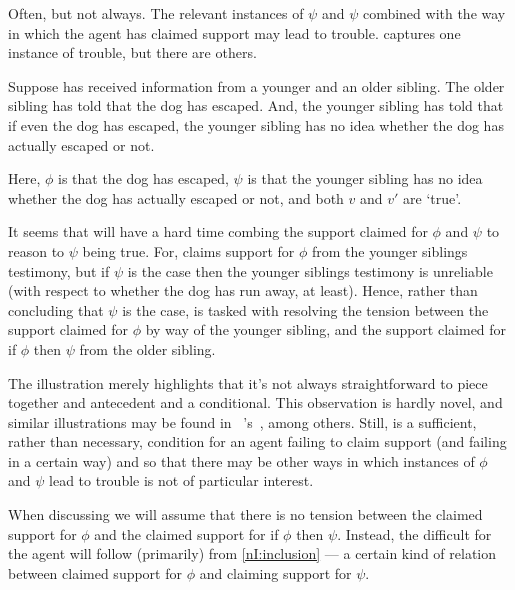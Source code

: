\begin{note}
  Often, but not always.
  The relevant instances of \(\psi\) and \(\psi\) combined with the way in which the agent has claimed support may lead to trouble.
  \nI{} captures one instance of trouble, but there are others.

  \begin{illustration}
    Suppose  has received information from a younger and an older sibling.
    The older sibling has told  that the dog has escaped.
    And, the younger sibling has told  that if even the dog has escaped, the younger sibling has no idea whether the dog has actually escaped or not.
  \end{illustration}

  Here, \(\phi\) is that the dog has escaped, \(\psi\) is that the younger sibling has no idea whether the dog has actually escaped or not, and both \(v\) and \(v'\) are `true'.

  It seems that  will have a hard time combing the support claimed for \(\phi\) and \(\psi\) to reason to \(\psi\) being true.
  For,  claims support for \(\phi\) from the younger siblings testimony, but if \(\psi\) is the case then the younger siblings testimony is unreliable (with respect to whether the dog has run away, at least).
  Hence, rather than concluding that \(\psi\) is the case,  is tasked with resolving the tension between the support claimed for \(\phi\) by way of the younger sibling, and the support claimed for if \(\phi\) then \(\psi\) from the older sibling.

  The illustration merely highlights that it's not always straightforward to piece together and antecedent and a conditional.
  This observation is hardly novel, and similar illustrations may be found in ~\citeauthor{Harman:1986ux}'s~, among others.
  Still, \nI{} is a sufficient, rather than necessary, condition for an agent failing to claim support (and failing in a certain way) and so that there may be other ways in which instances of \(\phi\) and \(\psi\) lead to trouble is not of particular interest.

  When discussing \nI{} we will assume that there is no tension between the claimed support for \(\phi\) and the claimed support for if \(\phi\) then \(\psi\).
  Instead, the difficult for the agent will follow (primarily) from \ref{nI:inclusion} --- a certain kind of relation between claimed support for \(\phi\) and claiming support for \(\psi\).
\end{note}


